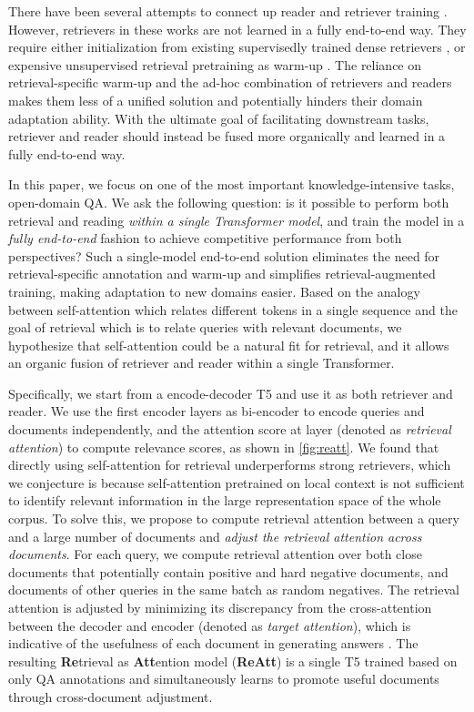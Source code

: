 \documentclass[11pt, dvipsnames]{article}
\newcommand{\ours}{ReAtt\xspace}
\newcommand{\adjust}{adjust\xspace}
\newcommand{\adjustment}{cross-document adjustment\xspace}
\begin{document}
There have been several attempts to connect up reader and retriever training \cite{orqa-2019-lee,realm-2020-guu,rag-2020-lewis,emdr2-2021-sachan,yono-2021-lee,atlas-2022-izacard}.
However, retrievers in these works are not learned in a fully end-to-end way.
They require either initialization from existing supervisedly trained dense retrievers \cite{rag-2020-lewis}, or expensive unsupervised retrieval pretraining as warm-up \cite{orqa-2019-lee,realm-2020-guu,emdr2-2021-sachan,yono-2021-lee,atlas-2022-izacard}.
The reliance on retrieval-specific warm-up and the ad-hoc combination of retrievers and readers makes them less of a unified solution and potentially hinders their domain adaptation ability.
With the ultimate goal of facilitating downstream tasks, retriever and reader should instead be fused more organically and learned in a fully end-to-end way.

In this paper, we focus on one of the most important knowledge-intensive tasks, open-domain QA.
We ask the following question: is it possible to perform both retrieval and reading \emph{within a single Transformer model}, and train the model in a \emph{fully end-to-end} fashion to achieve competitive performance from both perspectives?
Such a single-model end-to-end solution eliminates the need for retrieval-specific annotation and warm-up and simplifies retrieval-augmented training, making adaptation to new domains easier.
Based on the analogy between self-attention which relates different tokens in a single sequence \cite{transformer-2017-vaswani} and the goal of retrieval which is to relate queries with relevant documents, we hypothesize that self-attention could be a natural fit for retrieval, and it allows an organic fusion of retriever and reader within a single Transformer.

Specifically, we start from a encode-decoder T5 \cite{t5-2020-raffel} and use it as both retriever and reader.
We use the first  encoder layers as bi-encoder to encode queries and documents independently, and the attention score at layer  (denoted as \emph{retrieval attention}) to compute relevance scores, as shown in \autoref{fig:reatt}.
We found that directly using self-attention for retrieval underperforms strong retrievers, which we conjecture is because self-attention pretrained on local context is not sufficient to identify relevant information in the large representation space of the whole corpus.
To solve this, we propose to compute retrieval attention between a query and a large number of documents and \emph{\adjust the retrieval attention across documents}.
For each query, we compute retrieval attention over both close documents that potentially contain positive and hard negative documents, and documents of other queries in the same batch as random negatives.
The retrieval attention is adjusted by minimizing its discrepancy from the cross-attention between the decoder and encoder (denoted as \emph{target attention}), which is indicative of the usefulness of each document in generating answers \cite{fid-kd-2021-izacard}.
The resulting \textbf{Re}trieval as \textbf{Att}ention model (\textbf{\ours}) is a single T5 trained based on only QA annotations and simultaneously learns to promote useful documents through \adjustment.
\end{document}
